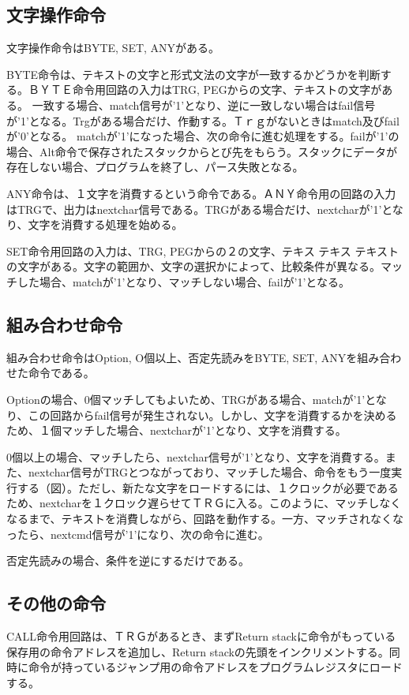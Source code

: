 \documentclass[12pt,oneside]{report}
\begin{document}
\subsection{文字操作命令}
文字操作命令はBYTE, SET, ANYがある。

BYTE命令は、テキストの文字と形式文法の文字が一致するかどうかを判断する。ＢＹＴＥ命令用回路の入力はTRG, PEGからの文字、テキストの文字がある。
一致する場合、match信号が'1'となり、逆に一致しない場合はfail信号が'1'となる。Trgがある場合だけ、作動する。Ｔｒｇがないときはmatch及びfailが'0'となる。
matchが'1'になった場合、次の命令に進む処理をする。failが'1'の場合、Alt命令で保存されたスタックからとび先をもらう。スタックにデータが存在しない場合、プログラムを終了し、パース失敗となる。

ANY命令は、１文字を消費するという命令である。ＡＮＹ命令用の回路の入力はTRGで、出力はnextchar信号である。TRGがある場合だけ、nextcharが'1'となり、文字を消費する処理を始める。

SET命令用回路の入力は、TRG, PEGからの２の文字、テキス
テキス
テキストの文字がある。文字の範囲か、文字の選択かによって、比較条件が異なる。マッチした場合、matchが'1'となり、マッチしない場合、failが'1'となる。


\subsection{組み合わせ命令}
組み合わせ命令はOption, O個以上、否定先読みをBYTE, SET, ANYを組み合わせた命令である。

Optionの場合、0個マッチしてもよいため、TRGがある場合、matchが'1'となり、この回路からfail信号が発生されない。しかし、文字を消費するかを決めるため、１個マッチした場合、nextcharが'1'となり、文字を消費する。

0個以上の場合、マッチしたら、nextchar信号が'1'となり、文字を消費する。また、nextchar信号がTRGとつながっており、マッチした場合、命令をもう一度実行する（図）。ただし、新たな文字をロードするには、１クロックが必要であるため、nextcharを１クロック遅らせてＴＲＧに入る。このように、マッチしなくなるまで、テキストを消費しながら、回路を動作する。一方、マッチされなくなったら、nextcmd信号が'1'になり、次の命令に進む。

否定先読みの場合、条件を逆にするだけである。


\subsection{その他の命令}

CALL命令用回路は、ＴＲＧがあるとき、まずReturn stackに命令がもっている保存用の命令アドレスを追加し、Return stackの先頭をインクリメントする。同時に命令が持っているジャンプ用の命令アドレスをプログラムレジスタにロードする。
\end{document}

